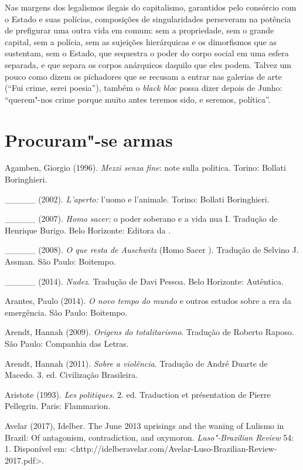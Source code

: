 Nas margens dos legalismos ilegais do capitalismo, garantidos pelo
consórcio com o Estado e suas polícias, composições de singularidades
perseveram na potência de prefigurar uma outra vida em comum: sem a
propriedade, sem o grande capital, sem a polícia, sem as sujeições
hierárquicas e os dimorfismos que as sustentam, sem o Estado, que
sequestra o poder do corpo social em uma esfera separada, e que separa
os corpos anárquicos daquilo que eles podem. Talvez um pouco como dizem
os pichadores que se recusam a entrar nas galerias de arte (``Fui crime,
serei poesia''), também o \emph{black bloc} possa dizer depois de Junho:
``querem"-nos crime porque muito antes teremos sido, e seremos,
política''.

\chapter{Procuram"-se armas}

Agamben, Giorgio (1996). \emph{Mezzi senza fine}: note sulla politica.
Torino: Bollati Boringhieri.

\_\_\_\_\_ (2002). \emph{L'aperto: }l'uomo e l'animale. Torino: Bollati
Boringhieri.

\_\_\_\_\_ (2007). \emph{Homo sacer: }o poder soberano e a vida nua I.
Tradução de Henrique Burigo. Belo Horizonte: Editora da .

\_\_\_\_\_ (2008). \emph{O que resta de Auschwitz} (Homo Sacer ).
Tradução de Selvino J. Assman. São Paulo: Boitempo.

\_\_\_\_\_ (2014). \emph{Nudez}. Tradução de Davi Pessoa. Belo
Horizonte: Autêntica.

Arantes, Paulo (2014). \emph{O novo tempo do mundo }e outros estudos
sobre a era da emergência. São Paulo: Boitempo.

Arendt, Hannah (2009). \emph{Origens do totalitarismo}. Tradução de
Roberto Raposo. São Paulo: Companhia das Letras.

Arendt, Hannah (2011). \emph{Sobre a violência}. Tradução de André
Duarte de Macedo. 3. ed. Civilização Brasileira.

Aristote (1993). \emph{Les politiques}. 2. ed. Traduction et
présentation de Pierre Pellegrin. Paris:  Flammarion.

Avelar (2017), Idelber. The June 2013 uprisings and the waning of
Lulismo in Brazil: Of antagonism, contradiction, and oxymoron.
\emph{Luso"-Brazilian Review} 54: 1. Disponível em:
\textless{}http://idelberavelar.com/Avelar-Luso-Brazilian-Review-2017.pdf\textgreater{}.

